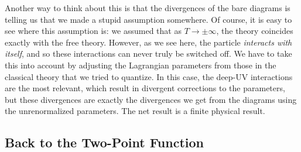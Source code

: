 \documentclass{article}
\numberwithin{equation}{subsection}
\begin{document}
Another way to think about this is that the divergences of the bare diagrams is telling us that we made a stupid assumption somewhere. Of course, it
is easy to see where this assumption is: we assumed that as $T\to\pm\infty$, the theory coincides exactly with the free theory. However, as we see
here, the particle \textit{interacts with itself}, and so these interactions can never truly be switched off. We have to take this into account by
adjusting the Lagrangian parameters from those in the classical theory that we tried to quantize. In this case, the deep-UV interactions are the most relevant,
which result in divergent corrections to the parameters, but these divergences are exactly the divergences we get from the diagrams using the
unrenormalized parameters. The net result is a finite physical result.


\subsection{Back to the Two-Point Function}
\end{document}
